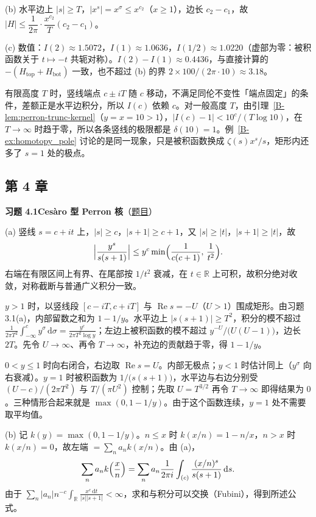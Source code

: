 \documentclass[11pt,a4paper]{article}
\newcommand{\RR}{\mathbb{R}}
\newcommand{\dd}{\,\mathrm{d}}
\renewcommand{\Re}{\operatorname{Re}}
\newcommand{\bref}[1]{\ref*{B-#1}}
\newcommand{\Sol}[2]{%
  \par\addvspace{1.2em}\noindent
  \hypertarget{s:#1}{}\textbf{习题 #1\quad #2}\hfill{\small（\hyperlink{q:#1}{题目}）}\par
  \nopagebreak\smallskip}
\begin{document}
(b) 水平边上 $|s|\ge T$，$|x^s|=x^\sigma\le x^{c_2}$（$x\ge1$），边长 $c_2-c_1$，故 $|H|\le\dfrac{1}{2\pi}\cdot\dfrac{x^{c_2}}{T}(c_2-c_1)$。

(c) 数值：$I(2)\approx1.5072$，$I(1)\approx1.0636$，$I(1/2)\approx1.0220$（虚部为零：被积函数关于 $t\mapsto-t$ 共轭对称）。$I(2)-I(1)\approx0.4436$，与直接计算的 $-(H_{\mathrm{top}}+H_{\mathrm{bot}})$ 一致，也不超过 (b) 的界 $2\times100/(2\pi\cdot10)\approx3.18$。

有限高度 $T$ 时，竖线端点 $c\pm iT$ 随 $c$ 移动，不满足同伦不变性「端点固定」的条件，差额正是水平边积分，所以 $I(c)$ 依赖 $c$。对一般高度 $T$，由引理~\bref{lem:perron-trunc-kernel}（$y=x=10>1$），$|I(c)-1|<10^c/(T\log10)$，在 $T\to\infty$ 时趋于零，所以各条竖线的极限都是 $\delta(10)=1$。例~\bref{ex:homotopy_pole} 讨论的是同一现象，只是被积函数换成 $\zeta(s)x^s/s$，矩形内还多了 $s=1$ 处的极点。

\subsection*{第 4 章}

\Sol{4.1}{Cesàro 型 Perron 核}
(a) 竖线 $s=c+it$ 上，$|s|\ge c$，$|s+1|\ge c+1$，又 $|s|\ge|t|$，$|s+1|\ge|t|$，故
\[
  \Bigl|\frac{y^s}{s(s+1)}\Bigr|\le y^c\min\Bigl(\frac1{c(c+1)},\,\frac1{t^2}\Bigr).
\]
右端在有限区间上有界、在尾部按 $1/t^2$ 衰减，在 $t\in\RR$ 上可积，故积分绝对收敛，对称截断与普通广义积分一致。

$y>1$ 时，以竖线段 $[c-iT,c+iT]$ 与 $\Re s=-U$（$U>1$）围成矩形。由习题 3.1(a)，内部留数之和为 $1-1/y$。水平边上 $|s(s+1)|\ge T^2$，积分的模不超过 $\frac1{2\pi T^2}\int_{-\infty}^cy^\sigma\dd\sigma=\frac{y^c}{2\pi T^2\log y}$；左边上被积函数的模不超过 $y^{-U}/\bigl(U(U-1)\bigr)$，边长 $2T$。先令 $U\to\infty$、再令 $T\to\infty$，补充边的贡献趋于零，得 $1-1/y$。

$0<y\le1$ 时向右闭合，右边取 $\Re s=U$。内部无极点；$y<1$ 时估计同上（$y^\sigma$ 向右衰减）。$y=1$ 时被积函数为 $1/\bigl(s(s+1)\bigr)$，水平边与右边分别受 $(U-c)/(2\pi T^2)$ 与 $T/(\pi U^2)$ 控制；先取 $U=T^{3/2}$ 再令 $T\to\infty$ 即得结果为 $0$。三种情形合起来就是 $\max(0,1-1/y)$。由于这个函数连续，$y=1$ 处不需要取平均值。

(b) 记 $k(y)=\max(0,1-1/y)$。$n\le x$ 时 $k(x/n)=1-n/x$，$n>x$ 时 $k(x/n)=0$，故左端 $=\sum_na_nk(x/n)$。由 (a)，
\[
  \sum_na_nk\Bigl(\frac xn\Bigr)=\sum_na_n\frac1{2\pi i}\int_{(c)}\frac{(x/n)^s}{s(s+1)}\dd s .
\]
由于 $\sum_n|a_n|n^{-c}\int_{\RR}\frac{x^c\dd t}{|s||s+1|}<\infty$，求和与积分可以交换（Fubini），得到所述公式。
\end{document}
